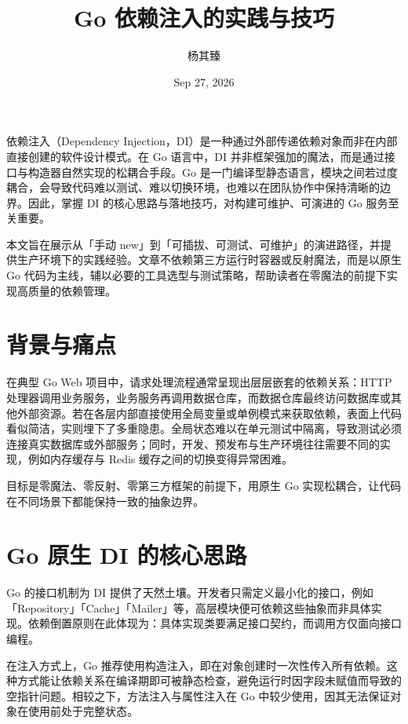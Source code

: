 \title{Go 依赖注入的实践与技巧}
\author{杨其臻}
\date{Sep 27, 2026}
\maketitle
依赖注入（Dependency Injection，DI）是一种通过外部传递依赖对象而非在内部直接创建的软件设计模式。在 Go 语言中，DI 并非框架强加的魔法，而是通过接口与构造器自然实现的松耦合手段。Go 是一门编译型静态语言，模块之间若过度耦合，会导致代码难以测试、难以切换环境，也难以在团队协作中保持清晰的边界。因此，掌握 DI 的核心思路与落地技巧，对构建可维护、可演进的 Go 服务至关重要。\par
本文旨在展示从「手动 new」到「可插拔、可测试、可维护」的演进路径，并提供生产环境下的实践经验。文章不依赖第三方运行时容器或反射魔法，而是以原生 Go 代码为主线，辅以必要的工具选型与测试策略，帮助读者在零魔法的前提下实现高质量的依赖管理。\par
\chapter{背景与痛点}
在典型 Go Web 项目中，请求处理流程通常呈现出层层嵌套的依赖关系：HTTP 处理器调用业务服务，业务服务再调用数据仓库，而数据仓库最终访问数据库或其他外部资源。若在各层内部直接使用全局变量或单例模式来获取依赖，表面上代码看似简洁，实则埋下了多重隐患。全局状态难以在单元测试中隔离，导致测试必须连接真实数据库或外部服务；同时，开发、预发布与生产环境往往需要不同的实现，例如内存缓存与 Redis 缓存之间的切换变得异常困难。\par
目标是零魔法、零反射、零第三方框架的前提下，用原生 Go 实现松耦合，让代码在不同场景下都能保持一致的抽象边界。\par
\chapter{Go 原生 DI 的核心思路}
Go 的接口机制为 DI 提供了天然土壤。开发者只需定义最小化的接口，例如「Repository」「Cache」「Mailer」等，高层模块便可依赖这些抽象而非具体实现。依赖倒置原则在此体现为：具体实现类要满足接口契约，而调用方仅面向接口编程。\par
在注入方式上，Go 推荐使用构造注入，即在对象创建时一次性传入所有依赖。这种方式能让依赖关系在编译期即可被静态检查，避免运行时因字段未赋值而导致的空指针问题。相较之下，方法注入与属性注入在 Go 中较少使用，因其无法保证对象在使用前处于完整状态。\par
